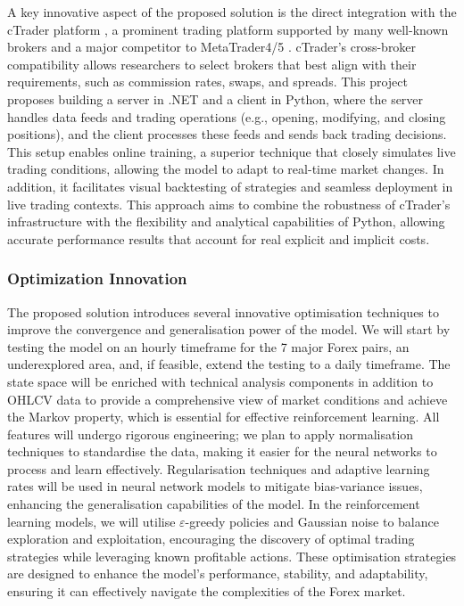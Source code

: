 A key innovative aspect of the proposed solution is the direct integration with the cTrader platform \cite{noauthor_forex_nodate}, a prominent trading platform supported by many well-known brokers and a major competitor to MetaTrader4/5 \cite{noauthor_metatrader_nodate}. cTrader’s cross-broker compatibility allows researchers to select brokers that best align with their requirements, such as commission rates, swaps, and spreads. This project proposes building a server in .NET and a client in Python, where the server handles data feeds and trading operations (e.g., opening, modifying, and closing positions), and the client processes these feeds and sends back trading decisions. This setup enables online training, a superior technique that closely simulates live trading conditions, allowing the model to adapt to real-time market changes. In addition, it facilitates visual backtesting of strategies and seamless deployment in live trading contexts. This approach aims to combine the robustness of cTrader’s infrastructure with the flexibility and analytical capabilities of Python, allowing accurate performance results that account for real explicit and implicit costs.

\subsubsection{Optimization Innovation}

The proposed solution introduces several innovative optimisation techniques to improve the convergence and generalisation power of the model. We will start by testing the model on an hourly timeframe for the 7 major Forex pairs, an underexplored area, and, if feasible, extend the testing to a daily timeframe. The state space will be enriched with technical analysis components in addition to OHLCV data to provide a comprehensive view of market conditions and achieve the Markov property, which is essential for effective reinforcement learning. All features will undergo rigorous engineering; we plan to apply normalisation techniques to standardise the data, making it easier for the neural networks to process and learn effectively. Regularisation techniques and adaptive learning rates will be used in neural network models to mitigate bias-variance issues, enhancing the generalisation capabilities of the model. In the reinforcement learning models, we will utilise \(\varepsilon\)-greedy policies and Gaussian noise to balance exploration and exploitation, encouraging the discovery of optimal trading strategies while leveraging known profitable actions. These optimisation strategies are designed to enhance the model's performance, stability, and adaptability, ensuring it can effectively navigate the complexities of the Forex market.

